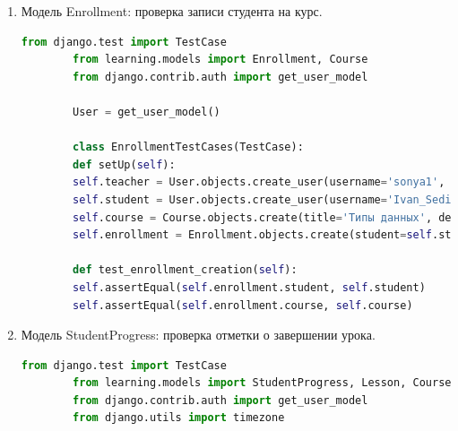 \begin{enumerate}
\begin{lstlisting}[language=Python, caption=Модульный тест для TestResult, label=lst:testresult_test]
		User = get_user_model()
		
		class TestResultTestCases(TestCase):
		def setUp(self):
		self.teacher = User.objects.create_user(username='sonya1', password='vanya232323', is_teacher=True)
		self.student = User.objects.create_user(username='Ivan_Sedih', password='vanya232323', is_student=True)
		self.course = Course.objects.create(title='Объекты', description='Описание курса', creator=self.teacher)
		self.lesson = Lesson.objects.create(title='Создание объектов', content='Содержимое урока', order=1, course=self.course)
		self.test = Test.objects.create(title='Тест', passing_score=70, lesson=self.lesson)
		self.test_result = TestResult.objects.create(
		student=self.student,
		lesson=self.lesson,
		score=85,
		answers='{"q1": "a1"}',
		attempts=1,
		completed_at=timezone.now()
		)
		
		def test_testresult_creation(self):
		self.assertEqual(self.test_result.score, 85)
		self.assertEqual(self.test_result.student, self.student)
		self.assertEqual(self.test_result.lesson, self.lesson)
	\end{lstlisting}
	
	\item Модель Enrollment: проверка записи студента на курс.
	\begin{lstlisting}[language=Python, caption=Модульный тест для Enrollment, label=lst:enrollment_test]
		from django.test import TestCase
		from learning.models import Enrollment, Course
		from django.contrib.auth import get_user_model
		
		User = get_user_model()
		
		class EnrollmentTestCases(TestCase):
		def setUp(self):
		self.teacher = User.objects.create_user(username='sonya1', password='vanya232323', is_teacher=True)
		self.student = User.objects.create_user(username='Ivan_Sedih', password='vanya232323', is_student=True)
		self.course = Course.objects.create(title='Типы данных', description='Описание курса', creator=self.teacher)
		self.enrollment = Enrollment.objects.create(student=self.student, course=self.course)
		
		def test_enrollment_creation(self):
		self.assertEqual(self.enrollment.student, self.student)
		self.assertEqual(self.enrollment.course, self.course)
	\end{lstlisting}
	
	\item Модель StudentProgress: проверка отметки о завершении урока.
	\begin{lstlisting}[language=Python, caption=Модульный тест для StudentProgress, label=lst:studentprogress_test]
		from django.test import TestCase
		from learning.models import StudentProgress, Lesson, Course
		from django.contrib.auth import get_user_model
		from django.utils import timezone
		

\end{lstlisting}
\end{enumerate}

